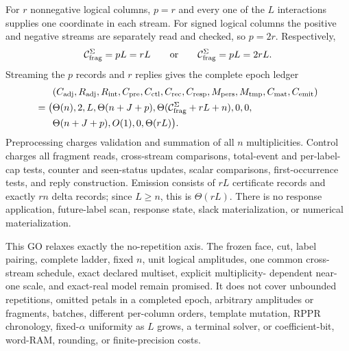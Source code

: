 \begin{theorem}
For $r$ nonnegative logical columns, $p=r$ and every one of the $L$
interactions supplies one coordinate in each stream.  For signed logical
columns the positive and negative streams are separately read and checked,
so $p=2r$.  Respectively,
\begin{equation}
 \mathcal C_{\rm frag}^{\Sigma}=pL=rL
 \qquad\text{or}\qquad
 \mathcal C_{\rm frag}^{\Sigma}=pL=2rL.
 \label{eq:notched-sun-multiplicity-fragments}
\end{equation}
Streaming the $p$ records and $r$ replies gives the complete epoch ledger
\begin{equation}
 \begin{aligned}
 &(C_{\rm adj},R_{\rm adj},R_{\rm int},C_{\rm pre},C_{\rm ctl},C_{\rm rec},
 C_{\rm resp},M_{\rm pers},M_{\rm tmp},C_{\rm mat},C_{\rm emit})\\
 =\bigl(&\Theta(n),2,L,\Theta(n+J+p),
 \Theta(\mathcal C_{\rm frag}^{\Sigma}+rL+n),0,0,\\
 &\Theta(n+J+p),O(1),0,\Theta(rL)\bigr).
 \end{aligned}
 \label{eq:notched-sun-multiplicity-eleven-vector}
\end{equation}
Preprocessing charges validation and summation of all $n$ multiplicities.
Control charges all fragment reads, cross-stream comparisons, total-event and
per-label-cap tests, counter and seen-status updates, scalar comparisons,
first-occurrence tests, and reply construction.  Emission consists of $rL$
certificate records and exactly $rn$ delta records; since $L\geq n$, this is
$\Theta(rL)$.  There is no response application, future-label scan, response
state, slack materialization, or numerical materialization.

This GO relaxes exactly the no-repetition axis.  The frozen face, cut, label
pairing, complete ladder, fixed $n$, unit logical amplitudes, one common
cross-stream schedule, exact declared multiset, explicit multiplicity-
dependent near-one scale, and exact-real model remain promised.  It does not
cover unbounded repetitions, omitted petals in a completed epoch, arbitrary
amplitudes or fragments, batches, different per-column orders, template
mutation, RPPR chronology, fixed-$\alpha$ uniformity as $L$ grows, a terminal
solver, or coefficient-bit, word-RAM, rounding, or finite-precision costs.
\end{theorem}

